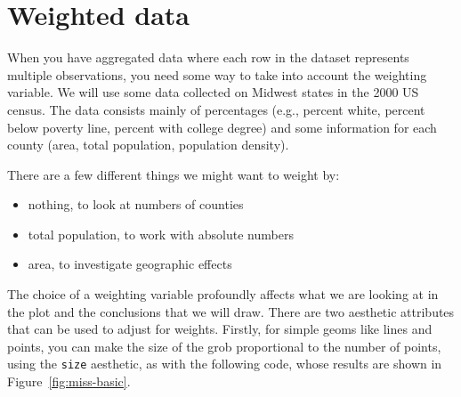 
\section{Weighted data}
\label{sec:weighting}


When you have aggregated data where each row in the dataset represents multiple observations, you need some way to take into account the weighting variable.  We will use some data collected on Midwest states in the 2000 US census. The data consists mainly of percentages (e.g., percent white, percent below poverty line, percent with college degree) and some information for each county (area, total population, population density). 

There are a few different things we might want to weight by: 

\begin{itemize}
  \item nothing, to look at numbers of counties
  \item total population, to work with absolute numbers
  \item area, to investigate geographic effects
\end{itemize}

\noindent The choice of a weighting variable profoundly affects what we are looking at in the plot and the conclusions that we will draw.  There are two aesthetic attributes that can be used to adjust for weights.  Firstly, for simple geoms like lines and points, you can make the size of the grob proportional to the number of points, using the {\tt size} aesthetic, as with the following code, whose results are shown in Figure~\ref{fig:miss-basic}.

%


